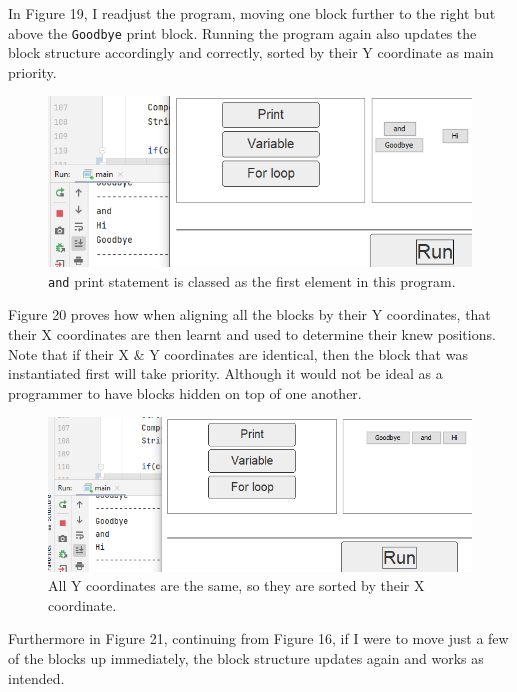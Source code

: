 \documentclass[a4paper, 12pt]{article}
\begin{document}
            In Figure 19, I readjust the program, moving one block further to the right but above the
            \texttt{Goodbye} print block. Running the program again also updates the block structure
            accordingly and correctly, sorted by their Y coordinate as main priority.

            \begin{figure}[h]
                \centering
                \includegraphics[width=120mm]{blockstructure2.png}
                \caption{\texttt{and} print statement is classed as the first element
                in this program.}
            \end{figure}

            Figure 20 proves how when aligning all the blocks by their Y coordinates, that their X
            coordinates are then learnt and used to determine their knew positions. Note that if their
            X \& Y coordinates are identical, then the block that was instantiated first will take priority.
            Although it would not be ideal as a programmer to have blocks hidden on top of one another.

            \clearpage
            \begin{figure}[h]
                \centering
                \includegraphics[width=120mm]{blockstructure3.png}
                \caption{All Y coordinates are the same, so they are sorted by their X coordinate.}
            \end{figure}

            Furthermore in Figure 21, continuing from Figure 16, if I were to move just a few of the
            blocks up immediately, the block structure updates again and works as intended.
\end{document}
